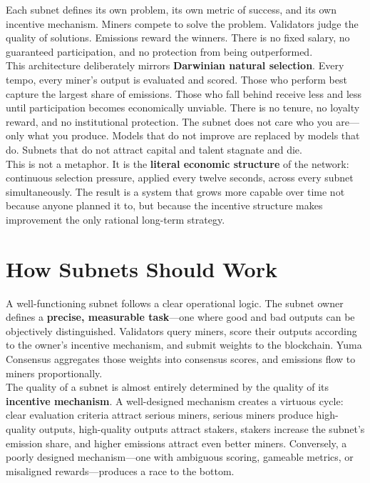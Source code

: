 \documentclass[12pt, a4paper, oneside]{report}
\theoremstyle{definition}
\begin{document}
Each subnet defines its own problem, its own metric of success, and its own 
incentive mechanism. Miners compete to solve the problem. Validators judge the 
quality of solutions. Emissions reward the winners. There is no fixed salary, 
no guaranteed participation, and no protection from being outperformed.\\[0.4cm]

This architecture deliberately mirrors \textbf{Darwinian natural selection}. 
Every tempo, every miner's output is evaluated and scored. Those who perform 
best capture the largest share of emissions. Those who fall behind receive less 
and less until participation becomes economically unviable. There is no tenure, 
no loyalty reward, and no institutional protection. The subnet does not care 
who you are—only what you produce. Models that do not improve are replaced by 
models that do. Subnets that do not attract capital and talent stagnate and 
die.\\[0.4cm]

This is not a metaphor. It is the \textbf{literal economic structure} of the 
network: continuous selection pressure, applied every twelve seconds, across 
every subnet simultaneously. The result is a system that grows more capable 
over time not because anyone planned it to, but because the incentive structure 
makes improvement the only rational long-term strategy.

\section{How Subnets Should Work}

A well-functioning subnet follows a clear operational logic. The subnet owner 
defines a \textbf{precise, measurable task}—one where good and bad outputs can 
be objectively distinguished. Validators query miners, score their outputs 
according to the owner's incentive mechanism, and submit weights to the 
blockchain. Yuma Consensus aggregates those weights into consensus scores, and 
emissions flow to miners proportionally.\\[0.4cm]

The quality of a subnet is almost entirely determined by the quality of its 
\textbf{incentive mechanism}. A well-designed mechanism creates a virtuous 
cycle: clear evaluation criteria attract serious miners, serious miners produce 
high-quality outputs, high-quality outputs attract stakers, stakers increase 
the subnet's emission share, and higher emissions attract even better miners. 
Conversely, a poorly designed mechanism—one with ambiguous scoring, gameable 
metrics, or misaligned rewards—produces a race to the bottom.\\[0.4cm]
\end{document}
